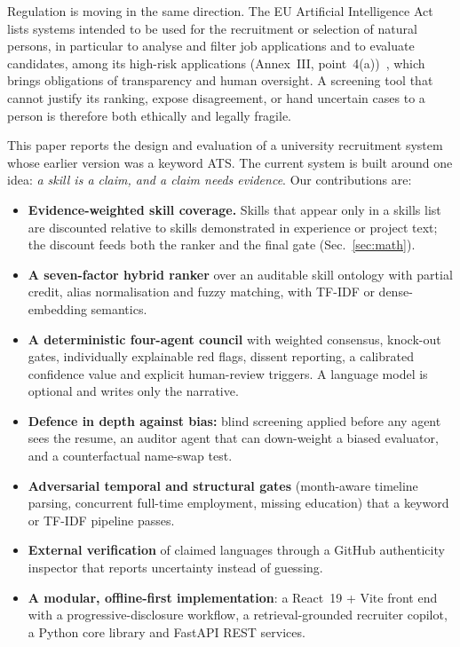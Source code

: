 \documentclass[conference]{IEEEtran}
\begin{document}
Regulation is moving in the same direction. The EU Artificial Intelligence Act lists systems intended to be used for the recruitment or selection of natural persons, in particular to analyse and filter job applications and to evaluate candidates, among its high-risk applications (Annex~III, point~4(a))~\cite{euai}, which brings obligations of transparency and human oversight. A screening tool that cannot justify its ranking, expose disagreement, or hand uncertain cases to a person is therefore both ethically and legally fragile.

This paper reports the design and evaluation of a university recruitment system whose earlier version was a keyword ATS. The current system is built around one idea: \emph{a skill is a claim, and a claim needs evidence}. Our contributions are:
\begin{itemize}
\item \textbf{Evidence-weighted skill coverage.} Skills that appear only in a skills list are discounted relative to skills demonstrated in experience or project text; the discount feeds both the ranker and the final gate (Sec.~\ref{sec:math}).
\item \textbf{A seven-factor hybrid ranker} over an auditable skill ontology with partial credit, alias normalisation and fuzzy matching, with TF-IDF or dense-embedding semantics.
\item \textbf{A deterministic four-agent council} with weighted consensus, knock-out gates, individually explainable red flags, dissent reporting, a calibrated confidence value and explicit human-review triggers. A language model is optional and writes only the narrative.
\item \textbf{Defence in depth against bias:} blind screening applied before any agent sees the resume, an auditor agent that can down-weight a biased evaluator, and a counterfactual name-swap test.
\item \textbf{Adversarial temporal and structural gates} (month-aware timeline parsing, concurrent full-time employment, missing education) that a keyword or TF-IDF pipeline passes.
\item \textbf{External verification} of claimed languages through a GitHub authenticity inspector that reports uncertainty instead of guessing.
\item \textbf{A modular, offline-first implementation}: a React~19 + Vite front end with a progressive-disclosure workflow, a retrieval-grounded recruiter copilot, a Python core library and FastAPI REST services.
\end{itemize}
\end{document}
